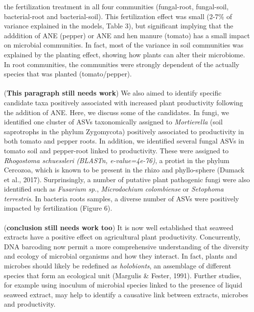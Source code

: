 \documentclass[11pt,]{article}
\begin{document}
the fertilization treatment in all four communities (fungal-root,
fungal-soil, bacterial-root and bacterial-soil). This fertilization
effect was small (2-7\% of variance explained in the models, Table 3),
but significant implying that the adddition of ANE (pepper) or ANE and
hen manure (tomato) has a small impact on microbial communities. In
fact, most of the variance in soil communities was explained by the
planting effect, showing how plants can alter their microbiome. In root
communities, the communities were strongly dependent of the actually
species that was planted (tomato/pepper).\\
\hspace*{0.333em}\\
(\textbf{This paragraph still needs work}) We also aimed to identify
specific candidate taxa positively associated with increased plant
productivity following the addition of ANE. Here, we discuss some of the
candidates. In fungi, we identified one cluster of ASVs taxonomically
assigned to \emph{Mortierella} (soil saprotrophs in the phylum
Zygomycota) positively associated to productivity in both tomato and
pepper roots. In addition, we identified several fungal ASVs in tomato
soil and pepper-root linked to productivity. These were assigned to
\emph{Rhogostoma schuessleri (BLASTn, e-value=4e-76)}, a protist in the
phylum Cercozoa, which is known to be present in the rhizo and
phyllo-sphere (Dumack et al., 2017). Surprinsingly, a number of putative
plant pathogenic fungi were also identified such as \emph{Fusarium sp.},
\emph{Microdochium colombiense} or \emph{Setophoma terrestris}. In
bacteria roots samples, a diverse number of ASVs were positively
impacted by fertilization (Figure 6).\\
\hspace*{0.333em}\\
(\textbf{conclusion still needs work too}) It is now well established
that seaweed extracts have a positive effect on agricultural plant
productivity. Concurrently, DNA barcoding now permit a more
comprehensive understanding of the diversity and ecology of microbial
organisms and how they interact. In fact, plants and microbes should
likely be redefined as \emph{holobionts}, an assemblage of different
species that form an ecological unit (Margulis \& Fester, 1991). Further
studies, for example using inoculum of microbial species linked to the
presence of liquid seaweed extract, may help to identify a causative
link between extracts, microbes and productivity.\\
\hspace*{0.333em}\\
\hspace*{0.333em}
\end{document}
